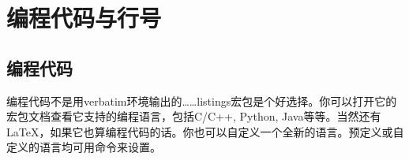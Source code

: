 \section{编程代码与行号}
\label{sec:coding}
\subsection{编程代码}
编程代码不是用verbatim环境输出的……listings宏包是个好选择。你可以打开它的宏包文档查看它支持的编程语言，包括C/C++, Python, Java等等。当然还有\LaTeX，如果它也算编程代码的话。你也可以自定义一个全新的语言。预定义或自定义的语言均可用\latexline{\\lstset}命令来设置。
\begin{latex}{}
\end{latex}


